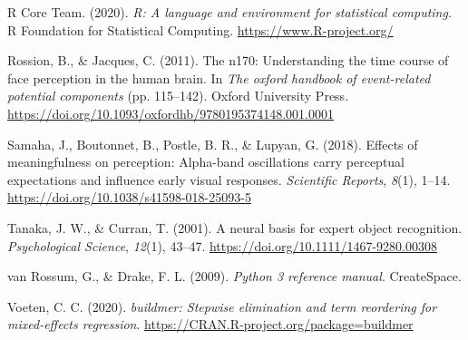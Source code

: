 \documentclass[
  english,
  man,11pt,floatsintext]{apa7}
\newlength{\cslhangindent}
\newenvironment{cslreferences}%
  {\setlength{\parindent}{0pt}%
  \everypar{\setlength{\hangindent}{\cslhangindent}}\ignorespaces}%
  {\par}
\begin{document}
\begin{cslreferences}
\leavevmode\hypertarget{ref-R-base}{}%
R Core Team. (2020). \emph{R: A language and environment for statistical computing}. R Foundation for Statistical Computing. \url{https://www.R-project.org/}

\leavevmode\hypertarget{ref-rossion2011}{}%
Rossion, B., \& Jacques, C. (2011). The n170: Understanding the time course of face perception in the human brain. In \emph{The oxford handbook of event-related potential components} (pp. 115--142). Oxford University Press. \url{https://doi.org/10.1093/oxfordhb/9780195374148.001.0001}

\leavevmode\hypertarget{ref-samaha2018}{}%
Samaha, J., Boutonnet, B., Postle, B. R., \& Lupyan, G. (2018). Effects of meaningfulness on perception: Alpha-band oscillations carry perceptual expectations and influence early visual responses. \emph{Scientific Reports}, \emph{8}(1), 1--14. \url{https://doi.org/10.1038/s41598-018-25093-5}

\leavevmode\hypertarget{ref-tanaka2001}{}%
Tanaka, J. W., \& Curran, T. (2001). A neural basis for expert object recognition. \emph{Psychological Science}, \emph{12}(1), 43--47. \url{https://doi.org/10.1111/1467-9280.00308}

\leavevmode\hypertarget{ref-vanrossum2009}{}%
van Rossum, G., \& Drake, F. L. (2009). \emph{Python 3 reference manual}. CreateSpace.

\leavevmode\hypertarget{ref-R-buildmer}{}%
Voeten, C. C. (2020). \emph{buildmer: Stepwise elimination and term reordering for mixed-effects regression}. \url{https://CRAN.R-project.org/package=buildmer}
\end{cslreferences}

\endgroup
\end{document}
